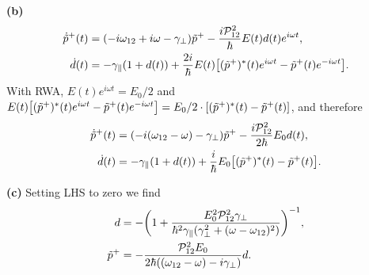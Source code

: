 \documentclass{article}
\makeatletter
\newcommand*{\shifttext}[1]{%
  \settowidth{\@tempdima}{#1}%
  \hspace{-\@tempdima}#1%
}
\newcommand{\plabel}[1]{%
\shifttext{\textbf{#1}\quad}%
}
\newcommand{\minusbaseline}{\abovedisplayskip=0pt\abovedisplayshortskip=0pt~\vspace*{-\baselineskip}}%
\makeatother
\begin{document}
\plabel{(b)}%
\begingroup\minusbaseline
\begin{align*}
    \dot{\tilde{p}}^+(t) &= (-i \omega_{12} + i\omega - \gamma_\perp) \tilde{p}^+ - \frac{i \mathcal{P}_{12}^2}{\hbar} E(t) d(t) e^{i\omega t}, \\
    \dot{d}(t) &= -\gamma_\parallel (1+d(t)) + \frac{2i}{\hbar} E(t) \qty[(\tilde{p}^+)^*(t) e^{i\omega t} - \tilde{p}^+(t) e^{-i\omega t}].
\end{align*}
\endgroup
With RWA, $E(t)e^{i\omega t} = E_0/2$ and $E(t) \qty[(\tilde{p}^+)^*(t) e^{i\omega t} - \tilde{p}^+(t) e^{-i\omega t}] = E_0/2\cdot \qty[(\tilde{p}^+)^*(t) - \tilde{p}^+(t)]$, and therefore
\begin{align*}
    \dot{\tilde{p}}^+(t) &= (-i (\omega_{12} - \omega) - \gamma_\perp) \tilde{p}^+ - \frac{i \mathcal{P}_{12}^2}{2 \hbar} E_0 d(t), \\
    \dot{d}(t) &= -\gamma_\parallel (1+d(t)) + \frac{i}{\hbar} E_0 \qty[(\tilde{p}^+)^*(t)  - \tilde{p}^+(t)].
\end{align*}

\plabel{(c)}%
Setting LHS to zero we find
\begin{align*}
    d &= -\qty(1 + \frac{E_0^2 \mathcal{P}_{12}^2 \gamma_\perp}{\hbar^2 \gamma_\parallel (\gamma^2_\perp + (\omega-\omega_{12})^2)})^{-1}, \\
    \tilde{p}^+ &= -\frac{\mathcal{P}_{12}^2 E_0}{2\hbar((\omega_{12} - \omega) - i\gamma_\perp)} d.
\end{align*}
\end{document}
